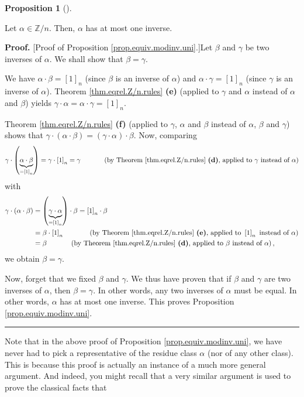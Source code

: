 \documentclass[numbers=enddot,12pt,final,onecolumn,notitlepage]{scrartcl}%
\numberwithin{exer}{subsection}
\theoremstyle{definition}
\newtheorem{prop}[theo]{Proposition}
\newenvironment{proposition}[1][]
{\begin{prop}[#1]\begin{leftbar}}
{\end{leftbar}\end{prop}}
\newenvironment{proof}[1][Proof]{\noindent\textbf{#1.} }{\ \rule{0.5em}{0.5em}}
\begin{document}
\begin{proposition}
\label{prop.equiv.modinv.uni}Let $\alpha\in\mathbb{Z}/n$. Then, $\alpha$ has
at most one inverse.
\end{proposition}

\begin{proof}
[Proof of Proposition \ref{prop.equiv.modinv.uni}.]Let $\beta$ and $\gamma$ be
two inverses of $\alpha$. We shall show that $\beta=\gamma$.

We have $\alpha\cdot\beta=\left[  1\right]  _{n}$ (since $\beta$ is an inverse
of $\alpha$) and $\alpha\cdot\gamma=\left[  1\right]  _{n}$ (since $\gamma$ is
an inverse of $\alpha$). Theorem \ref{thm.eqrel.Z/n.rules} \textbf{(e)}
(applied to $\gamma$ and $\alpha$ instead of $\alpha$ and $\beta$) yields
$\gamma\cdot\alpha=\alpha\cdot\gamma=\left[  1\right]  _{n}$.

Theorem \ref{thm.eqrel.Z/n.rules} \textbf{(f)} (applied to $\gamma$, $\alpha$
and $\beta$ instead of $\alpha$, $\beta$ and $\gamma$) shows that $\gamma
\cdot\left(  \alpha\cdot\beta\right)  =\left(  \gamma\cdot\alpha\right)
\cdot\beta$. Now, comparing
\[
\gamma\cdot\left(  \underbrace{\alpha\cdot\beta}_{=\left[  1\right]  _{n}%
}\right)  =\gamma\cdot\left[  1\right]  _{n}=\gamma\ \ \ \ \ \ \ \ \ \ \left(
\text{by Theorem \ref{thm.eqrel.Z/n.rules} \textbf{(d)}, applied to }%
\gamma\text{ instead of }\alpha\right)
\]
with%
\begin{align*}
\gamma\cdot\left(  \alpha\cdot\beta\right)   &  =\left(  \underbrace{\gamma
\cdot\alpha}_{=\left[  1\right]  _{n}}\right)  \cdot\beta=\left[  1\right]
_{n}\cdot\beta\\
&  =\beta\cdot\left[  1\right]  _{n}\ \ \ \ \ \ \ \ \ \ \ \left(  \text{by
Theorem \ref{thm.eqrel.Z/n.rules} \textbf{(e)}, applied to }\left[  1\right]
_{n}\text{ instead of }\alpha\right) \\
&  =\beta\ \ \ \ \ \ \ \ \ \ \left(  \text{by Theorem
\ref{thm.eqrel.Z/n.rules} \textbf{(d)}, applied to }\beta\text{ instead of
}\alpha\right)  ,
\end{align*}
we obtain $\beta=\gamma$.

Now, forget that we fixed $\beta$ and $\gamma$. We thus have proven that if
$\beta$ and $\gamma$ are two inverses of $\alpha$, then $\beta=\gamma$. In
other words, any two inverses of $\alpha$ must be equal. In other words,
$\alpha$ has at most one inverse. This proves Proposition
\ref{prop.equiv.modinv.uni}.
\end{proof}

Note that in the above proof of Proposition \ref{prop.equiv.modinv.uni}, we
have never had to pick a representative of the residue class $\alpha$ (nor of
any other class). This is because this proof is actually an instance of a much
more general argument. And indeed, you might recall that a very similar
argument is used to prove the classical facts that
\end{document}
